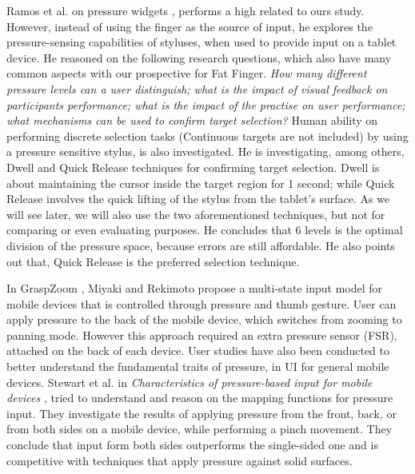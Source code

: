Ramos et al. on pressure widgets \cite{Ramos2004}, performs a high related to ours study. However, instead of using the finger as the source of input, he explores the pressure-sensing capabilities of styluses, when used to provide input on a tablet device. He reasoned on the following research questions, which also have many common aspects with our prospective for Fat Finger.
\emph{How many different pressure levels can a user distinguish; what is the impact of visual feedback on participants performance; what is the impact of the practise on user performance; what mechanisms can be used to confirm target selection?}
Human ability on performing discrete selection tasks (Continuous targets are not included) by using a pressure sensitive stylus,  is also investigated. He is investigating, among others, Dwell and Quick Release techniques for confirming target selection. 
Dwell is about maintaining the cursor inside the target region for 1 second; while Quick Release involves the quick lifting of the stylus from the tablet’s surface.
As we will see later, we will also use the two aforementioned techniques, but not for comparing or even evaluating purposes. He  concludes that 6 levels is the optimal division of the pressure space, because errors are still affordable. He also points out that, Quick Release is the preferred selection technique.


In GraspZoom \cite{Miyaki:2009:GZS:1613858.1613872}, Miyaki and Rekimoto propose a multi-state input model for mobile devices that is controlled through pressure and thumb gesture. User can apply pressure to the back of the mobile device, which switches from zooming to panning mode. However this approach required an extra pressure sensor (FSR), attached on the back of each device.
User studies have also been conducted to better understand the fundamental traits of pressure, in UI for general mobile devices. Stewart et al. in \emph{Characteristics of pressure-based input for mobile devices} \cite{Stewart:2010:CPI:1753326.1753444}, tried to understand and reason on the mapping functions for pressure input. They investigate the results of applying pressure from the front, back, or from both sides on a mobile device, while performing a pinch movement. They conclude that input form both sides  outperforms the single-sided one and is competitive with techniques that apply pressure against solid surfaces. 

